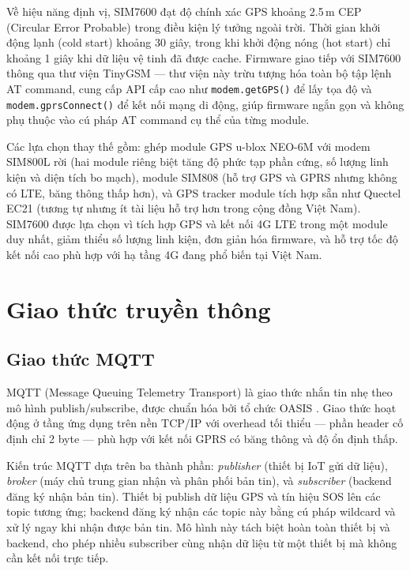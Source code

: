 \documentclass[../DoAn.tex]{subfiles}
\begin{document}
Về hiệu năng định vị, SIM7600 đạt độ chính xác GPS khoảng 2.5\,m CEP (Circular Error Probable) trong điều kiện lý tưởng ngoài trời. Thời gian khởi động lạnh (cold start) khoảng 30 giây, trong khi khởi động nóng (hot start) chỉ khoảng 1 giây khi dữ liệu vệ tinh đã được cache. Firmware giao tiếp với SIM7600 thông qua thư viện TinyGSM — thư viện này trừu tượng hóa toàn bộ tập lệnh AT command, cung cấp API cấp cao như \texttt{modem.getGPS()} để lấy tọa độ và \texttt{modem.gprsConnect()} để kết nối mạng di động, giúp firmware ngắn gọn và không phụ thuộc vào cú pháp AT command cụ thể của từng module.

Các lựa chọn thay thế gồm: ghép module GPS u-blox NEO-6M với modem SIM800L rời (hai module riêng biệt tăng độ phức tạp phần cứng, số lượng linh kiện và diện tích bo mạch), module SIM808 (hỗ trợ GPS và GPRS nhưng không có LTE, băng thông thấp hơn), và GPS tracker module tích hợp sẵn như Quectel EC21 (tương tự nhưng ít tài liệu hỗ trợ hơn trong cộng đồng Việt Nam). SIM7600 được lựa chọn vì tích hợp GPS và kết nối 4G LTE trong một module duy nhất, giảm thiểu số lượng linh kiện, đơn giản hóa firmware, và hỗ trợ tốc độ kết nối cao phù hợp với hạ tầng 4G đang phổ biến tại Việt Nam.

\section{Giao thức truyền thông}
\label{section:3.2}

\subsection{Giao thức MQTT}
\label{subsection:3.2.1}

MQTT (Message Queuing Telemetry Transport) là giao thức nhắn tin nhẹ theo mô hình publish/subscribe, được chuẩn hóa bởi tổ chức OASIS \cite{mqtt_standard}. Giao thức hoạt động ở tầng ứng dụng trên nền TCP/IP với overhead tối thiểu — phần header cố định chỉ 2 byte — phù hợp với kết nối GPRS có băng thông và độ ổn định thấp.

Kiến trúc MQTT dựa trên ba thành phần: \textit{publisher} (thiết bị IoT gửi dữ liệu), \textit{broker} (máy chủ trung gian nhận và phân phối bản tin), và \textit{subscriber} (backend đăng ký nhận bản tin). Thiết bị publish dữ liệu GPS và tín hiệu SOS lên các topic tương ứng; backend đăng ký nhận các topic này bằng cú pháp wildcard và xử lý ngay khi nhận được bản tin. Mô hình này tách biệt hoàn toàn thiết bị và backend, cho phép nhiều subscriber cùng nhận dữ liệu từ một thiết bị mà không cần kết nối trực tiếp.
\end{document}
